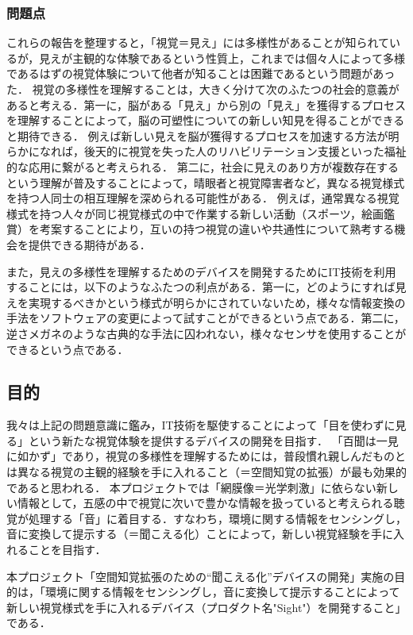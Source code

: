 \subsubsection{問題点}
これらの報告を整理すると，「視覚＝見え」には多様性があることが知られているが，見えが主観的な体験であるという性質上，これまでは個々人によって多様であるはずの視覚体験について他者が知ることは困難であるという問題があった．
視覚の多様性を理解することは，大きく分けて次のふたつの社会的意義があると考える．第一に，脳がある「見え」から別の「見え」を獲得するプロセスを理解することによって，脳の可塑性についての新しい知見を得ることができると期待できる．
例えば新しい見えを脳が獲得するプロセスを加速する方法が明らかになれば，後天的に視覚を失った人のリハビリテーション支援といった福祉的な応用に繋がると考えられる．
第二に，社会に見えのあり方が複数存在するという理解が普及することによって，晴眼者と視覚障害者など，異なる視覚様式を持つ人同士の相互理解を深められる可能性がある．
例えば，通常異なる視覚様式を持つ人々が同じ視覚様式の中で作業する新しい活動（スポーツ，絵画鑑賞）を考案することにより，互いの持つ視覚の違いや共通性について熟考する機会を提供できる期待がある．

また，見えの多様性を理解するためのデバイスを開発するためにIT技術を利用することには，以下のようなふたつの利点がある．第一に，どのようにすれば見えを実現するべきかという様式が明らかにされていないため，様々な情報変換の手法をソフトウェアの変更によって試すことができるという点である．第二に，逆さメガネのような古典的な手法に囚われない，様々なセンサを使用することができるという点である．

\subsection{目的}
我々は上記の問題意識に鑑み，IT技術を駆使することによって「目を使わずに見る」という新たな視覚体験を提供するデバイスの開発を目指す．
「百聞は一見に如かず」であり，視覚の多様性を理解するためには，普段慣れ親しんだものとは異なる視覚の主観的経験を手に入れること（＝空間知覚の拡張）が最も効果的であると思われる．
本プロジェクトでは「網膜像＝光学刺激」に依らない新しい情報として，五感の中で視覚に次いで豊かな情報を扱っていると考えられる聴覚が処理する「音」に着目する．すなわち，環境に関する情報をセンシングし，音に変換して提示する（＝聞こえる化）ことによって，新しい視覚経験を手に入れることを目指す．

本プロジェクト「空間知覚拡張のための``聞こえる化''デバイスの開発」実施の目的は，「環境に関する情報をセンシングし，音に変換して提示することによって新しい視覚様式を手に入れるデバイス（プロダクト名"Sight"）を開発すること」である．












